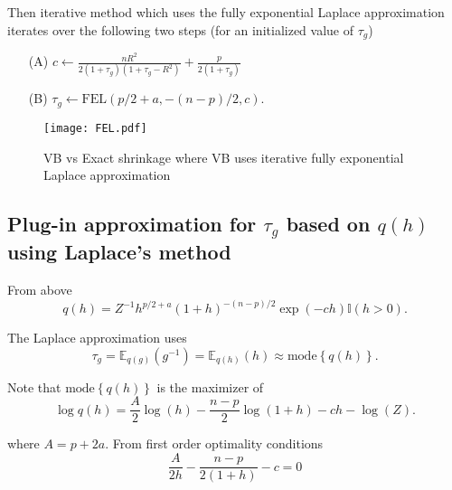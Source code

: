 \documentclass{article}
\def\bE{{\mathbb E}}                             %
\def\bI{{\mathbb I}}                             %
\def\ds{\displaystyle}
\begin{document}
\noindent Then iterative method which uses 
the fully exponential Laplace approximation iterates over the following
two steps (for an initialized value of $\tau_g$)
\begin{enumerate}
\item[(A)] $\ds c \leftarrow \frac{nR^2}{2( 1 + \tau_g)( 1 + \tau_g
	-   R^2)} + \frac{p}{2(1 + \tau_g)}$

\item[(B)] $\tau_g \leftarrow \mbox{FEL}(p/2+a,-(n-p)/2,c)$.
\end{enumerate}


\begin{figure}[ht]
	\centering
	\texttt{[image: FEL.pdf]}
	\caption{VB vs Exact shrinkage where VB uses iterative fully exponential Laplace approximation}
	\label{fig:03}
\end{figure}



\newpage 




\subsection{Plug-in approximation for $\tau_g$ based on $q(h)$ using Laplace's method}

From above
$$
q(h) = Z^{-1} h^{p/2 + a}(1+h)^{-(n-p)/2}\exp(-ch) \bI(h>0).
$$

\noindent The Laplace approximation uses
$$
\tau_g =\bE_{q(g)}(g^{-1}) = \bE_{q(h)}(h) \approx \mbox{mode}\left\{ q(h) \right\}.
$$

\noindent Note that 
$\mbox{mode}\left\{ q(h) \right\}$ is the maximizer of
$$
\log q(h) = \frac{A}{2}\log(h) - \frac{n-p}{2}\log(1 + h) - ch - \log(Z).
$$

\noindent where $A = p + 2a$.
From first order optimality conditions
$$
\frac{A}{2h} - \frac{n-p}{2(1+h)} - c = 0
$$
\end{document}
